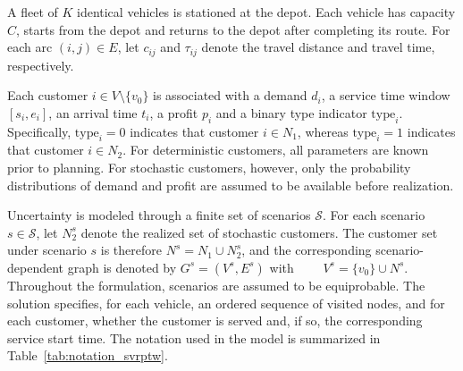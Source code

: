 \documentclass[pdflatex]{sn-jnl}
\begin{document}
A fleet of $K$ identical vehicles is stationed at the depot.
Each vehicle has capacity $C$, starts from the depot and returns to the depot after completing its route.
For each arc $(i,j)\in E$, let $c_{ij}$ and $\tau_{ij}$ denote the travel distance and travel time, respectively.

Each customer $i\in V\setminus\{v_0\}$ is associated with a demand $d_i$, a service time window $[s_i,e_i]$, an arrival time $t_i$, a profit $p_i$ and a binary type indicator $\mathrm{type}_i$.
Specifically, $\mathrm{type}_i=0$ indicates that customer $i\in N_1$, whereas $\mathrm{type}_i=1$ indicates that customer $i\in N_2$.
For deterministic customers, all parameters are known prior to planning.
For stochastic customers, however, only the probability distributions of demand and profit are assumed to be available before realization.

Uncertainty is modeled through a finite set of scenarios $\mathcal{S}$.
For each scenario $s\in\mathcal{S}$, let $N_2^s$ denote the realized set of stochastic customers.
The customer set under scenario $s$ is therefore $N^s = N_1 \cup N_2^s$, and the corresponding scenario-dependent graph is denoted by $G^s=(V^s,E^s)$ with $ \qquad V^s=\{v_0\}\cup N^s$.
Throughout the formulation, scenarios are assumed to be equiprobable. The solution specifies, for each vehicle, an ordered sequence of visited nodes, and for each customer, whether the customer is served and, if so, the corresponding service start time.
The notation used in the model is summarized in Table~\ref{tab:notation_svrptw}.
\end{document}
